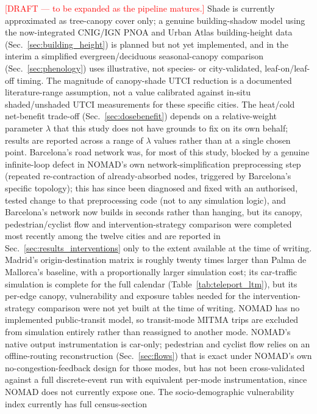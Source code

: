 \documentclass[pdflatex,sn-mathphys-ay]{sn-jnl}
\begin{document}
\textcolor{red}{[DRAFT --- to be expanded as the pipeline matures.]} Shade is
currently approximated as tree-canopy cover only; a genuine building-shadow
model using the now-integrated CNIG/IGN PNOA and Urban Atlas building-height
data (Sec.~\ref{sec:building_height}) is planned but not yet implemented, and
in the interim a simplified evergreen/deciduous seasonal-canopy comparison
(Sec.~\ref{sec:phenology}) uses illustrative, not species- or city-validated,
leaf-on/leaf-off timing. The magnitude of canopy-shade UTCI reduction is a
documented literature-range assumption, not a value calibrated against
in-situ shaded/unshaded UTCI measurements for these specific cities. The
heat/cold net-benefit trade-off (Sec.~\ref{sec:dosebenefit}) depends on a
relative-weight parameter $\lambda$ that this study does not have grounds to
fix on its own behalf; results are reported across a range of $\lambda$
values rather than at a single chosen point. Barcelona's road network was,
for most of this study, blocked by a genuine infinite-loop defect in
NOMAD's own network-simplification preprocessing step (repeated
re-contraction of already-absorbed nodes, triggered by Barcelona's specific
topology); this has since been diagnosed and fixed with an authorised,
tested change to that preprocessing code (not to any simulation logic), and
Barcelona's network now builds in seconds rather than hanging, but its
canopy, pedestrian/cyclist flow and intervention-strategy comparison were
completed most recently among the twelve cities and are reported in
Sec.~\ref{sec:results_interventions} only to the extent available at the
time of writing. Madrid's origin-destination matrix is roughly twenty times
larger than Palma de Mallorca's baseline, with a proportionally larger
simulation cost; its car-traffic simulation is complete for the full
calendar (Table~\ref{tab:teleport_ltm}), but its per-edge canopy,
vulnerability and exposure tables needed for the intervention-strategy
comparison were not yet built at the time of writing. NOMAD has no implemented
public-transit model, so transit-mode MITMA trips are excluded from
simulation entirely rather than reassigned to another mode. NOMAD's native
output instrumentation is car-only; pedestrian and cyclist flow relies on an
offline-routing reconstruction (Sec.~\ref{sec:flows}) that is exact under
NOMAD's own no-congestion-feedback design for those modes, but has not been
cross-validated against a full discrete-event run with equivalent per-mode
instrumentation, since NOMAD does not currently expose one. The
socio-demographic vulnerability index currently has full census-section
\end{document}
